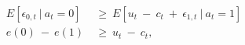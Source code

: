\begin{equation}
\begin{split}
     E \left[ \epsilon_{0, t} \ | \ a_{t} = 0 \right] \
     & \geq \ E \left[ u_{t} \ - \ c_{t} \ + \ \epsilon_{1, t} \ | \ a_{t} = 1 \right] \\
     e(0) \ - \ e(1) \ 
     & \geq \ u_{t} \ - \ c_{t},
\end{split}
\label{Equation:DCDP-Model_Decision-Rule}
\end{equation}